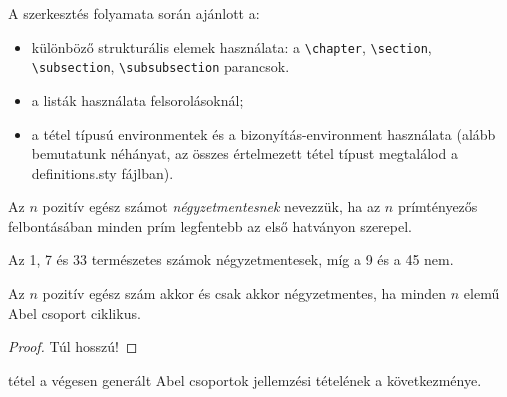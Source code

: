 A szerkesztés folyamata során ajánlott a:
\begin{itemize}
	\item különböző strukturális elemek használata: a \verb+\chapter+, \verb+\section+, \verb+\subsection+, \verb+\subsubsection+ parancsok.
	\item a listák használata felsorolásoknál;
  \item a tétel típusú environmentek és a bizonyítás-environment használata (alább bemutatunk néhányat, az összes értelmezett tétel típust megtalálod a definitions.sty fájlban).
\end{itemize}

\begin{ert}
  Az $n$ pozitív egész számot \emph{négyzetmentesnek} nevezzük, ha az $n$ prímtényezős felbontásában minden prím legfentebb az első hatványon szerepel.
\end{ert}
\begin{pld}
  Az 1, 7 és 33 természetes számok négyzetmentesek, míg a 9 és a 45 nem.
\end{pld}
\begin{tet}\label{tet:negyzment}
  Az $n$ pozitív egész szám akkor és csak akkor négyzetmentes, ha minden $n$ elemű Abel csoport ciklikus.
\end{tet}
\begin{proof}
  Túl hosszú!
\end{proof}
\begin{meg}
   tétel a végesen generált Abel csoportok jellemzési tételének a következménye. 
\end{meg}